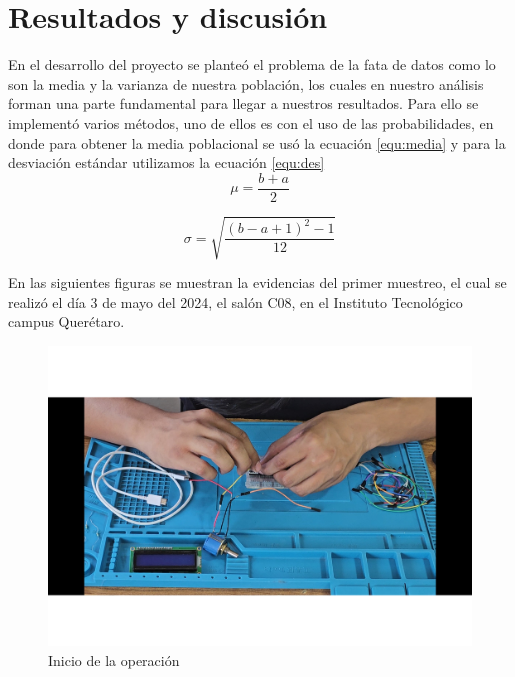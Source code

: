     
    \section{Resultados y discusión}
    
    En el desarrollo del proyecto se planteó el problema de la fata de datos como lo son la media y la varianza de nuestra población, los cuales en nuestro análisis forman una parte fundamental para llegar a nuestros resultados. Para ello se implementó varios métodos, uno de ellos es con el uso de las probabilidades, en donde para obtener la media poblacional se usó la ecuación \ref{equ:media} y para  la desviación estándar utilizamos la ecuación \ref{equ:des}
        \begin{equation}
            \label{equ:media}
           \mu = \dfrac{b+a}{2}
        \end{equation}
    
      \begin{equation}
            \label{equ:des}
            \sigma = \sqrt{\dfrac{(b-a+1)^2-1}{12}}
        \end{equation}
    
    
    
    En las siguientes figuras se muestran la evidencias del primer muestreo, el cual se realizó el día 3 de mayo del 2024, el salón C08, en el Instituto Tecnológico campus Querétaro.
    
       
    \begin{figure}[H]
        \centering
        \includegraphics[trim = {7mm 1mm 1mm 1mm},clip,scale=0.25]{22/Img/e2.pdf}
        \caption{Inicio de la operación}
        \label{fig:evi1}
    \end{figure}
    
